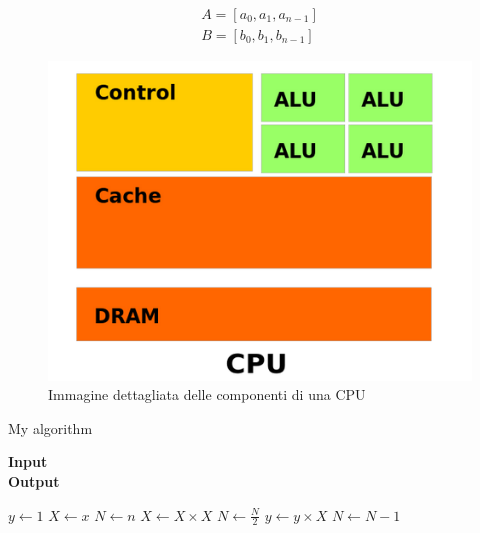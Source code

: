 \begin{lstlisting}[language=C]
    
\end{lstlisting}

\begin{align*}
    A = [a_0, a_1, a_{n - 1}] \\
    B = [b_0, b_1, b_{n - 1}]
\end{align*}

\begin{figure}[h!]
    \centering
    \includegraphics[scale=0.6]{img/CPU.png}
    \caption{Immagine dettagliata delle componenti di una CPU}
\end{figure}

\begin{algorithm}
    \caption{My algorithm}\label{alg:cap}
    \hspace*{\algorithmicindent} \textbf{Input} \\
    \hspace*{\algorithmicindent} \textbf{Output}
    \begin{algorithmic}[1]
        \State $y \gets 1$
        \State $X \gets x$
        \State $N \gets n$
            \State $X \gets X \times X$
            \State $N \gets \frac{N}{2}$  
            \State $y \gets y \times X$
            \State $N \gets N - 1$
        \EndIf
        \EndWhile
    \end{algorithmic}
\end{algorithm}

